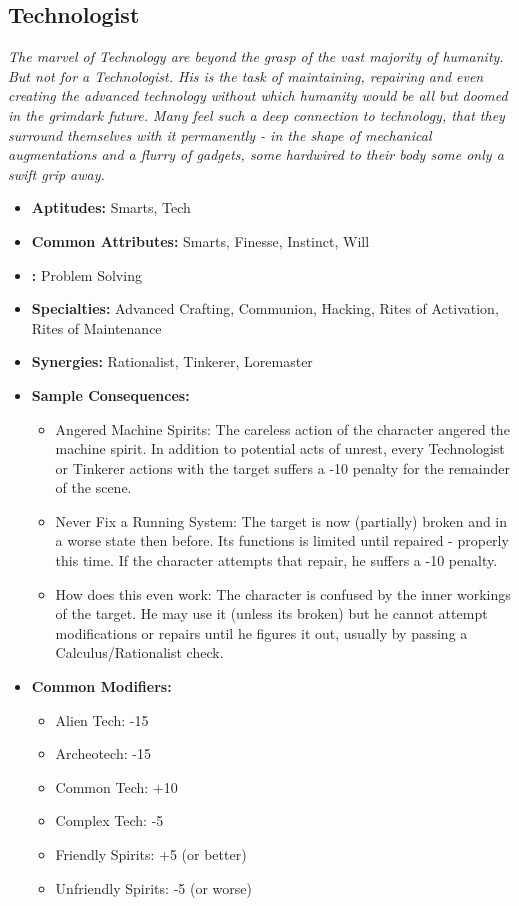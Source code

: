 \subsection{Technologist}\label{Technologist}
\textit{The marvel of Technology are beyond the grasp of the vast majority of humanity.
But not for a Technologist.
His is the task of maintaining, repairing and even creating the advanced technology without which humanity would be all but doomed in the grimdark future.
Many feel such a deep connection to technology, that they surround themselves with it permanently - in the shape of mechanical augmentations and a flurry of gadgets, some hardwired to their body some only a swift grip away.}
\begin{itemize}
	\item \textbf{Aptitudes:} Smarts, Tech
	\item \textbf{Common Attributes:} Smarts, Finesse, Instinct, Will 
	\item \textbf{:} Problem Solving
	\item \textbf{Specialties:} Advanced Crafting, Communion, Hacking, Rites of Activation, Rites of Maintenance
	\item \textbf{Synergies:} Rationalist, Tinkerer, Loremaster
	\item \textbf{Sample Consequences:} 
	\begin{itemize}
		\item Angered Machine Spirits: The careless action of the character angered the machine spirit. In addition to potential acts of unrest, every Technologist or Tinkerer actions with the target suffers a -10 penalty for the remainder of the scene.
		\item Never Fix a Running System: The target is now (partially) broken and in a worse state then before. Its functions is limited until repaired - properly this time. If the character attempts that repair, he suffers a -10 penalty.
		\item How does this even work: The character is confused by the inner workings of the target. He may use it (unless its broken) but he cannot attempt modifications or repairs until he figures it out, usually by passing a Calculus/Rationalist check.
	\end{itemize}
	\item \textbf{Common Modifiers:}
	\begin{itemize}
		\item Alien Tech: -15
		\item Archeotech: -15
		\item Common Tech: +10
		\item Complex Tech: -5
		\item Friendly Spirits: +5 (or better)
		\item Unfriendly Spirits: -5 (or worse)
	\end{itemize}
\end{itemize}

